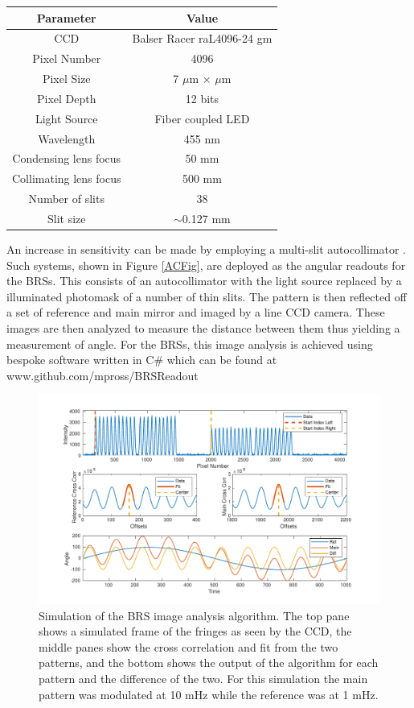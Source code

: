 \documentclass [12pt, proquest]{uwthesis}[2019]
\begin{document}
\begin{center}
\begin{tabular}{| c | c |}
\hline
Parameter & Value\\
\hline \hline
CCD & Balser Racer raL4096-24 gm\\
Pixel Number & 4096\\
Pixel Size & 7 $\mu$m $\times$  $\mu$m\\
Pixel Depth & 12 bits\\
Light Source & Fiber coupled LED\\
Wavelength & 455 nm\\
Condensing lens focus & 50 mm\\
Collimating lens focus & 500 mm\\
Number of slits & 38\\
Slit size & $\sim$0.127 mm\\
\hline
\end{tabular}
\label{ACTable}
\end{center}

An increase in sensitivity can be made by employing a multi-slit autocollimator \cite{MSA}. Such systems, shown in Figure \ref{ACFig}, are deployed as the angular readouts for the BRSs. This consists of an autocollimator with the light source replaced by a illuminated photomask of a number of thin slits. The pattern is then reflected off a set of reference and main mirror and imaged by a line CCD camera. These images are then analyzed to measure the distance between them thus yielding a measurement of angle. For the BRSs, this image analysis is achieved using bespoke software written in C\# which can be found at www.github.com/mpross/BRSReadout


\begin{figure}[!h]
\begin{center}
 \includegraphics[width=\textwidth]{BRS_ImgAnalysis.pdf}
\caption[Simulation of the BRS image analysis algorithm]{Simulation of the BRS image analysis algorithm. The top pane shows a simulated frame of the fringes as seen by the CCD, the middle panes show the cross correlation and fit from the two patterns, and the bottom shows the output of the algorithm for each pattern and the difference of the two. For this simulation the main pattern was modulated at 10 mHz while the reference was at 1 mHz.}
\label{ImgAnalysis}
\end{center}
\end{figure}
\end{document}
